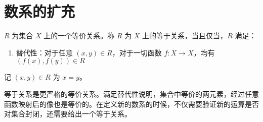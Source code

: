 \chapter{数系的扩充}

\begin{definition}
    $ R $ 为集合 $ X $ 上的一个等价关系。称 $ R $ 为 $ X $ 上的等于关系，当且仅当，$ R $ 满足：
    \begin{enumerate}
        \item 替代性：对于任意 $(x,y)\in R$，对于一切函数 $f:X\to X$，均有 $(f(x),f(y))\in R$
    \end{enumerate}
    记 $(x,y)\in R$ 为 $ x=y $。
\end{definition}

\begin{note}
    等于关系是更严格的等价关系。满足替代性说明，集合中等价的两元素，经过任意函数映射后的像也是等价的。在定义新的数系的时候，不仅需要验证新的运算是否对集合封闭，还需要给出一个等于关系。
\end{note}